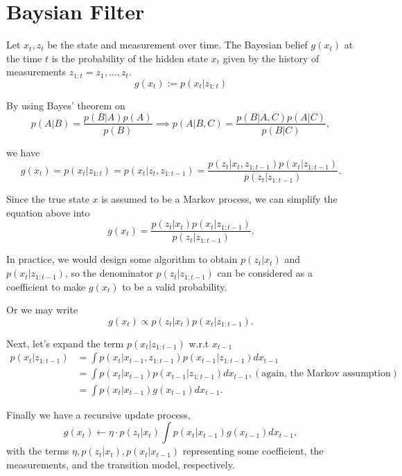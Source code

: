 \documentclass{article}
\begin{document}
\section{Baysian Filter}

Let $x_t, z_t$ be the state and measurement over time.
The Bayesian belief $g(x_t)$ at the time $t$
is the probability of the hidden
state $x_t$ given by the history of measurements
$z_{1:t} = z_1, \dots, z_t$.
\begin{equation*}
  g(x_t) := p(x_t|z_{1:t})
\end{equation*}

By using Bayes' theorem on
\begin{equation*}
  p(A|B) = \frac{p(B|A) p(A)}{p(B)}
  \implies
  p(A|B,C) = \frac{p(B|A,C) p(A|C)}{p(B|C)},
\end{equation*}

we have
\begin{equation*}
  g(x_t) = p(x_t|z_{1:t}) = p(x_t|z_t, z_{1:t-1})
  = \frac{p(z_t|x_t, z_{1:t-1}) p(x_t | z_{1:t-1})}{p(z_t|z_{1:t-1})}.
\end{equation*}

Since the true state $x$ is assumed to be a Markov process,
we can simplify the equation above into
\begin{equation*}
  g(x_t)
  = \frac{p(z_t|x_t) p(x_t | z_{1:t-1})}{p(z_t|z_{1:t-1})}.
\end{equation*}

In practice, we would design some algorithm to
obtain $p(z_t|x_t)$ and $p(x_t|z_{1:t-1})$,
so the denominator $p(z_t|z_{1:t-1})$ can be considered as a
coefficient to make $g(x_t)$ to be a valid probability.

Or we may write
\begin{equation*}
  g(x_t)
  \propto p(z_t|x_t) p(x_t | z_{1:t-1}).
\end{equation*}

Next, let's expand the term $p(x_t|z_{1:t-1})$ w.r.t $x_{t-1}$
\begin{align*}
  p(x_t|z_{1:t-1})
  &= \int p(x_t|x_{t-1}, z_{1:t-1}) p(x_{t-1}|z_{1:t-1}) d x_{t-1} \\
  &= \int p(x_t|x_{t-1}) p(x_{t-1}|z_{1:t-1}) d x_{t-1},
  (\text{again, the Markov assumption}) \\
  &= \int p(x_t|x_{t-1}) g(x_{t-1}) d x_{t-1}.
\end{align*}

Finally we have a recursive update process,
\begin{equation*}
  g(x_t) \leftarrow \eta \cdot p(z_t|x_t) \int p(x_t|x_{t-1}) g(x_{t-1}) d x_{t-1},
\end{equation*}
with the terms $\eta, p(z_t|x_t), p(x_t|x_{t-1})$ representing
some coefficient, the measurements, and the transition model, respectively.
\end{document}
